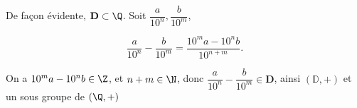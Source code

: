  
De façon évidente, $\mathbf D \subset \Q$. Soit $\dfrac{a}{10^n}, \dfrac{b}{10^m}$,

\[\dfrac{a}{10^n} - \dfrac{b}{10^m} = \dfrac{10^ma - 10^nb}{10^{n+m}}. \]


On a $10^ma - 10^nb \in \Z$, et $n+m \in \N$, donc $\dfrac{a}{10^n} - \dfrac{b}{10^m} \in \mathbf{D}$, ainsi 
$(\mathbb{D}, +)$ et un sous groupe de $( \Q, +)$